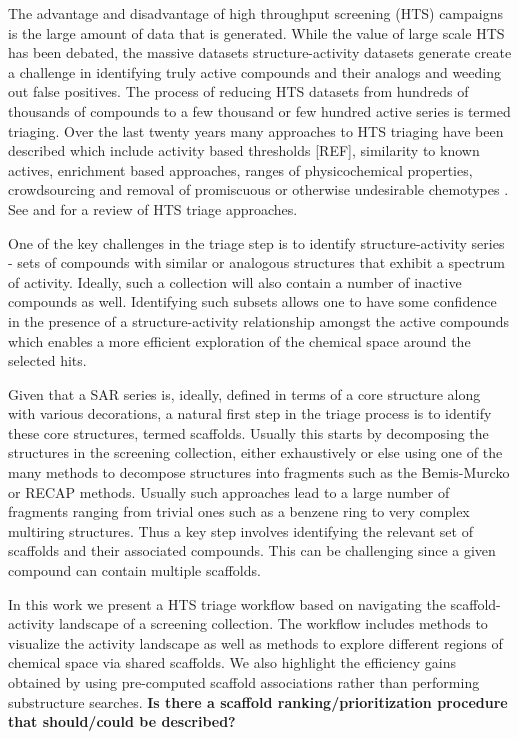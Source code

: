 \documentclass[journal=jacsat,manuscript=article]{achemso}
\begin{document}
The advantage and disadvantage of high throughput screening (HTS) campaigns is
the large amount of data that is generated. While the value of large scale HTS
has been debated\cite{Macarron:2011qv}, the massive datasets structure-activity
datasets generate create a challenge in identifying truly active compounds and
their analogs and weeding out false positives. The process of reducing HTS
datasets from hundreds of thousands of compounds to a few thousand or few
hundred active series is termed triaging. Over the last twenty years many
approaches to HTS triaging have been described which include activity based
thresholds [REF], similarity to known actives, enrichment based
approaches\cite{Varin2010CSE,Pu:2012wf}, ranges of physicochemical
properties\cite{Cox:2012qy}, crowdsourcing\cite{Peng:2013qp} and removal of
promiscuous or otherwise undesirable chemotypes \cite{Dahlin:2014fp}. See
\citeauthor{Shun:2011sy} and \citeauthor{Langer:2009mw} for a review of HTS
triage approaches.

One of the key challenges in the triage step is to identify structure-activity
series - sets of compounds with similar or analogous structures that exhibit a
spectrum of activity. Ideally, such a collection will also contain a number of
inactive compounds as well. Identifying such subsets allows one to have some
confidence in the presence of a structure-activity relationship amongst the
active compounds which enables a more efficient exploration of the chemical
space around the selected hits.

Given that a SAR series is, ideally, defined in terms of a core structure along
with various decorations, a natural first step in the triage process is to
identify these core structures, termed scaffolds. Usually this starts by
decomposing the structures in the screening collection, either exhaustively or
else using one of the many methods to decompose structures into fragments such
as the Bemis-Murcko\cite{BemisMurcko1999,BemisMurcko1996} or RECAP
methods\cite{Lewell:1998aa}. Usually such approaches lead to a large number of
fragments ranging from trivial ones such as a benzene ring to very complex
multiring structures. Thus a key step involves identifying the relevant set of
scaffolds and their associated compounds. This can be challenging since a given
compound can contain multiple scaffolds.

In this work we present a HTS triage workflow based on navigating the
scaffold-activity landscape of a screening collection. The workflow includes
methods to visualize the activity landscape as well as methods to explore
different regions of chemical space via shared scaffolds. We also highlight the
efficiency gains obtained by using pre-computed scaffold associations rather
than performing substructure searches. \textbf{Is there a scaffold
  ranking/prioritization procedure that should/could be described?}
\end{document}
